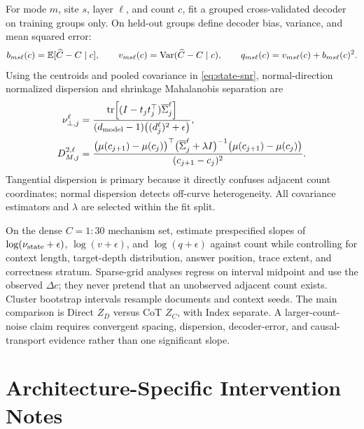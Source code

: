 For mode \(m\), site \(s\), layer \(\ell\), and count \(c\), fit a grouped cross-validated decoder on training groups only. On held-out groups define decoder bias, variance, and mean squared error:
\begin{equation}
b_{ms\ell}(c)=\mathbb{E}[\widehat C-C\mid c],
\qquad
v_{ms\ell}(c)=\operatorname{Var}(\widehat C-C\mid c),
\qquad
q_{ms\ell}(c)=v_{ms\ell}(c)+b_{ms\ell}(c)^2.
\label{eq:decoder-bias-var}
\end{equation}
Using the centroids and pooled covariance in \cref{eq:state-snr}, normal-direction normalized dispersion and shrinkage Mahalanobis separation are
\begin{align}
\nu_{\perp,j}^{\ell}
&=
\frac{
\operatorname{tr}\!\left[
(I-t_jt_j^\top)\overline\Sigma_j^\ell
\right]
}{
(d_{\rm model}-1)\big((d_j^\ell)^2+\epsilon\big)
},\\
D_{M,j}^{2,\ell}
&=
\frac{
\big(\mu(c_{j+1})-\mu(c_j)\big)^\top
\big(\overline\Sigma_j^\ell+\lambda I\big)^{-1}
\big(\mu(c_{j+1})-\mu(c_j)\big)
}{
(c_{j+1}-c_j)^2
}.
\label{eq:additional-noise}
\end{align}
Tangential dispersion is primary because it directly confuses adjacent count coordinates; normal dispersion detects off-curve heterogeneity. All covariance estimators and \(\lambda\) are selected within the fit split.

On the dense \(C=1{:}30\) mechanism set, estimate prespecified slopes of \(\log(\nu_{\rm state}+\epsilon)\), \(\log(v+\epsilon)\), and \(\log(q+\epsilon)\) against count while controlling for context length, target-depth distribution, answer position, trace extent, and correctness stratum. Sparse-grid analyses regress on interval midpoint and use the observed \(\Delta c\); they never pretend that an unobserved adjacent count exists. Cluster bootstrap intervals resample documents and context seeds. The main comparison is Direct \(Z_D\) versus CoT \(Z_C\), with Index separate. A larger-count-noise claim requires convergent spacing, dispersion, decoder-error, and causal-transport evidence rather than one significant slope.

\section{Architecture-Specific Intervention Notes}
\label{app:architecture}

